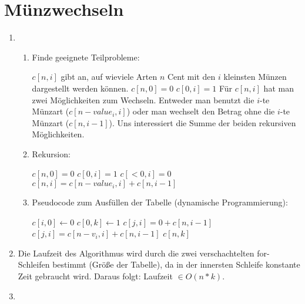 \documentclass[a4paper,10pt]{scrartcl}
\begin{document}
\section{Münzwechseln}
\begin{enumerate}
 \item 

  \begin{enumerate}
  \item Finde geeignete Teilprobleme:
    
  $c[n,i]$ gibt an, auf wieviele Arten $n$ Cent mit den $i$ kleinsten Münzen dargestellt werden können. \newline
  $c[n, 0] = 0$ \newline
  $c[0, i] = 1$ \newline
  Für $c[n, i]$ hat man zwei Möglichkeiten zum Wechseln. Entweder man benutzt die $i$-te Münzart ($c[n - value_i, i]$) oder man wechselt den Betrag ohne die $i$-te Münzart ($c[n, i - 1]$).
  Uns interessiert die Summe der beiden rekursiven Möglichkeiten.
  \item Rekursion:

  $c[n, 0] = 0$ \newline
  $c[0, i] = 1$ \newline
   $c[< 0, i] = 0$ \newline
  $c[n, i] = c[n - value_i, i] + c[n, i - 1]$
  \item Pseudocode zum Ausfüllen der Tabelle (dynamische Programmierung):

  \begin{algorithmic}
      \STATE $c[i, 0] \gets 0$
   \ENDFOR
      \STATE $c[0,k] \gets 1$
    \ENDFOR
	\STATE $c[j, i] = 0 + c[n, i - 1]$
      \ELSE
	\STATE $c[j, i] = c[n - v_i, i] + c[n, i - 1]$
      \ENDIF
    \ENDFOR
  \ENDFOR
  \RETURN $c[n,k]$
  \end{algorithmic}

  \end{enumerate}

 \item Die Laufzeit des Algorithmus wird durch die zwei verschachtelten for-Schleifen bestimmt (Größe der Tabelle), da in der innersten Schleife konstante Zeit gebraucht wird.
  Daraus folgt: Laufzeit $\in O(n*k)$.
 \item
  
\end{enumerate}
\end{document}
